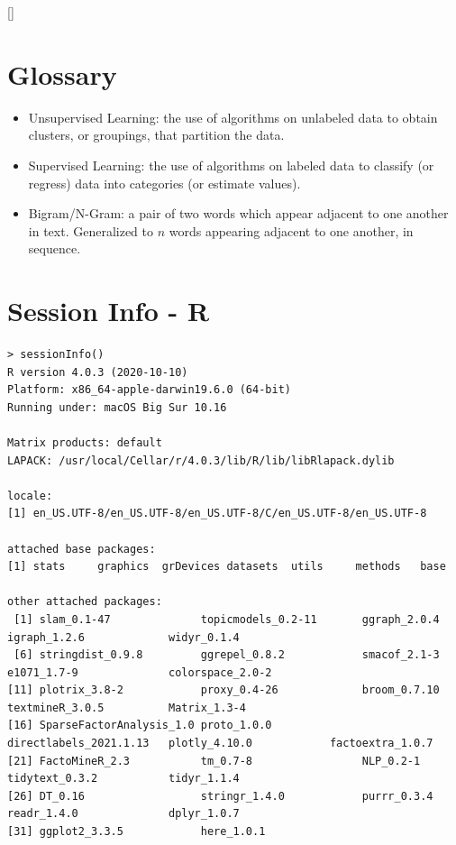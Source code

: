 \renewcommand\appendixpagename{Appendix}
\appendix



[\titlerule]
\begin{appendices}
\chapter{Glossary}
  \begin{itemize}
    \item{Unsupervised Learning: the use of algorithms on unlabeled data to obtain clusters, or groupings, that partition the data.}
  
    \item{Supervised Learning: the use of algorithms on labeled data to classify (or regress) data into categories (or estimate values).}
  
    \item{Bigram/N-Gram: a pair of two words which appear adjacent to one another in text. Generalized to $n$ words appearing adjacent to one another, in sequence.}

  \end{itemize}
\chapter{Session Info - R}

\begin{lstlisting}
> sessionInfo()
R version 4.0.3 (2020-10-10)
Platform: x86_64-apple-darwin19.6.0 (64-bit)
Running under: macOS Big Sur 10.16

Matrix products: default
LAPACK: /usr/local/Cellar/r/4.0.3/lib/R/lib/libRlapack.dylib

locale:
[1] en_US.UTF-8/en_US.UTF-8/en_US.UTF-8/C/en_US.UTF-8/en_US.UTF-8

attached base packages:
[1] stats     graphics  grDevices datasets  utils     methods   base     

other attached packages:
 [1] slam_0.1-47              topicmodels_0.2-11       ggraph_2.0.4             igraph_1.2.6             widyr_0.1.4             
 [6] stringdist_0.9.8         ggrepel_0.8.2            smacof_2.1-3             e1071_1.7-9              colorspace_2.0-2        
[11] plotrix_3.8-2            proxy_0.4-26             broom_0.7.10             textmineR_3.0.5          Matrix_1.3-4            
[16] SparseFactorAnalysis_1.0 proto_1.0.0              directlabels_2021.1.13   plotly_4.10.0            factoextra_1.0.7        
[21] FactoMineR_2.3           tm_0.7-8                 NLP_0.2-1                tidytext_0.3.2           tidyr_1.1.4             
[26] DT_0.16                  stringr_1.4.0            purrr_0.3.4              readr_1.4.0              dplyr_1.0.7             
[31] ggplot2_3.3.5            here_1.0.1              


\end{lstlisting}
\end{appendices}
